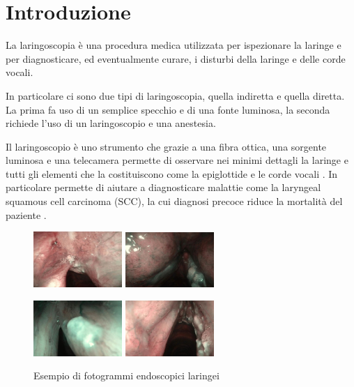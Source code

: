 \chapter{Introduzione}\label{introduzione}

La laringoscopia è una procedura medica utilizzata per ispezionare la laringe e per diagnosticare, ed eventualmente curare, i disturbi della laringe e delle corde vocali.

In particolare ci sono due tipi di laringoscopia, quella indiretta e quella diretta. La prima fa uso di un semplice specchio e di una fonte luminosa, la seconda richiede l'uso di un laringoscopio e una anestesia.

Il laringoscopio è uno strumento che grazie a una fibra ottica, una sorgente luminosa e una telecamera permette di osservare nei minimi dettagli la laringe e tutti gli elementi che la costituiscono come la epiglottide e le corde vocali \cite{giorgio_cenni_2008}. In particolare permette di aiutare a diagnosticare malattie come la laryngeal squamous cell carcinoma (SCC), la cui diagnosi precoce riduce la mortalità del paziente \cite{moccia_larynge}.

\begin{figure}[ht]
    \centering
    \includegraphics[width=0.3\textwidth]{introduzione/Larynge-1.jpg}
    \includegraphics[width=0.3\textwidth]{introduzione/Larynge-2.jpg}

    \includegraphics[width=0.3\textwidth]
    {introduzione/Larynge-3.jpg}
    \includegraphics[width=0.3\textwidth]{introduzione/Larynge-4.jpg}
    \caption{Esempio di fotogrammi endoscopici laringei}
    \label{fig:larynges}
\end{figure}

